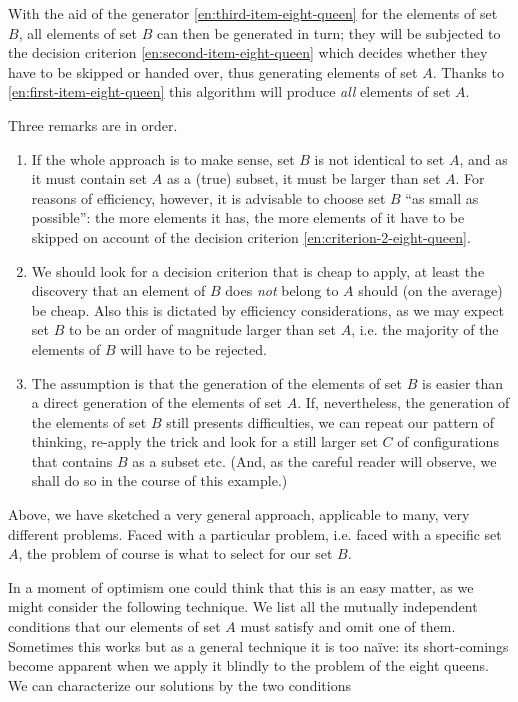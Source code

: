 \documentclass[twoside,11pt]{book}
\begin{document}
With the aid of the generator \ref{en:third-item-eight-queen} for the elements of set $B$, all elements of set $B$ can then be generated in turn; they will be subjected to the decision criterion \ref{en:second-item-eight-queen} which decides whether they have to be skipped or handed over, thus generating elements of set $A$. Thanks to \ref{en:first-item-eight-queen} this algorithm will produce \textit{all} elements of set $A$.

Three remarks are in order.

\begin{enumerate}[wide, nosep, label=(\arabic*)]
	\item If the whole approach is to make sense, set $B$ is not identical to set $A$, and as it must contain set $A$ as a (true) subset, it must be larger than set $A$. For reasons of efficiency, however, it is advisable to choose set $B$ ``as small as possible'': the more elements it has, the more elements of it have to be skipped on account of the decision criterion \ref{en:criterion-2-eight-queen}.
	
	\item \label{en:criterion-2-eight-queen}
	We should look for a decision criterion that is cheap to apply, at least the discovery that an element of $B$ does \textit{not} belong to $A$ should (on the average) be cheap. Also this is dictated by efficiency considerations, as we may expect set $B$ to be an order of magnitude larger than set $A$, i.e. the majority of the elements of $B$ will have to be rejected.
	
	\item The assumption is that the generation of the elements of set $B$ is easier than a direct generation of the elements of set $A$. If, nevertheless, the generation of the elements of set $B$ still presents difficulties, we can repeat our pattern of thinking, re-apply the trick and look for a still larger set $C$ of configurations that contains $B$ as a subset etc. (And, as the careful reader will observe, we shall do so in the course of this example.)
\end{enumerate}

Above, we have sketched a very general approach, applicable to many, very different problems. Faced with a particular problem, i.e. faced with a specific set $A$, the problem of course is what to select for our set $B$.

In a moment of optimism one could think that this is an easy matter, as we might consider the following technique. We list all the mutually independent conditions that our elements of set $A$ must satisfy and omit one of them. Sometimes this works but as a general technique it is too naïve: its short-comings become apparent when we apply it blindly to the problem of the eight queens. We can characterize our solutions by the two conditions
\end{document}
